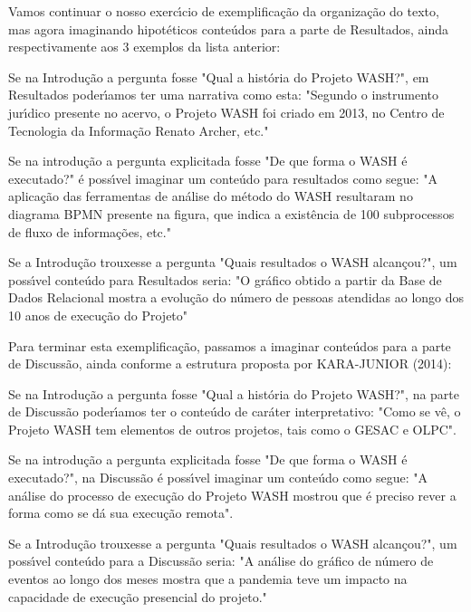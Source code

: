 \documentclass[
12pt,		%
openright,	%
twoside,  %
a4paper,			%
chapter=TITLE,		%
english,			%
french,				%
spanish,			%
brazil				%
]{USPSC-classe/USPSC}
\begin{document}
Vamos continuar o nosso exerc\'{\i}cio de exemplifica\c{c}\~ao da organiza\c{c}\~ao do texto, mas agora imaginando hipot\'eticos conte\'udos para a parte de Resultados, ainda respectivamente aos 3 exemplos da lista anterior:



\begin{alineas}
\item Se na Introdu\c{c}\~ao a pergunta fosse "Qual a hist\'oria do Projeto WASH?", em Resultados poder\'{\i}amos ter uma narrativa como esta: "Segundo o instrumento jur\'{\i}dico presente no acervo, o Projeto WASH foi criado em 2013, no Centro de Tecnologia da Informa\c{c}\~ao Renato Archer, etc."
\item Se na introdu\c{c}\~ao a pergunta explicitada fosse "De que forma o WASH \'e executado?" \'e poss\'{\i}vel imaginar um conte\'udo para resultados como segue: "A aplica\c{c}\~ao das ferramentas de an\'alise do m\'etodo do WASH resultaram no diagrama BPMN presente na figura, que indica a exist\^encia de 100 subprocessos de fluxo de informa\c{c}\~oes, etc."
\item Se a Introdu\c{c}\~ao trouxesse a pergunta "Quais resultados o WASH alcan\c{c}ou?", um poss\'{\i}vel conte\'udo para Resultados seria: "O gr\'afico obtido a partir da Base de Dados Relacional mostra a evolu\c{c}\~ao do n\'umero de pessoas atendidas ao longo dos 10 anos de execu\c{c}\~ao do Projeto"
\end{alineas}

Para terminar esta exemplifica\c{c}\~ao, passamos a imaginar conte\'udos para a parte de Discuss\~ao, ainda conforme a estrutura proposta por  KARA-JUNIOR (2014):



\begin{alineas}
\item Se na Introdu\c{c}\~ao a pergunta fosse "Qual a hist\'oria do Projeto WASH?", na parte de Discuss\~ao poder\'{\i}amos ter o conte\'udo de car\'ater interpretativo: "Como se v\^e, o Projeto WASH tem elementos de outros projetos, tais como o GESAC e OLPC".
\item Se na introdu\c{c}\~ao a pergunta explicitada fosse "De que forma o WASH \'e executado?", na Discuss\~ao \'e poss\'{\i}vel imaginar um conte\'udo como segue: "A an\'alise do processo de execu\c{c}\~ao do Projeto WASH mostrou que \'e preciso rever a forma como se d\'a sua execu\c{c}\~ao remota".
\item Se a Introdu\c{c}\~ao trouxesse a pergunta "Quais resultados o WASH alcan\c{c}ou?", um poss\'{\i}vel conte\'udo para a Discuss\~ao seria: "A an\'alise do gr\'afico de n\'umero de eventos ao longo dos meses mostra que a pandemia teve um impacto na capacidade de execu\c{c}\~ao presencial do projeto."
\end{alineas}
\end{document}
